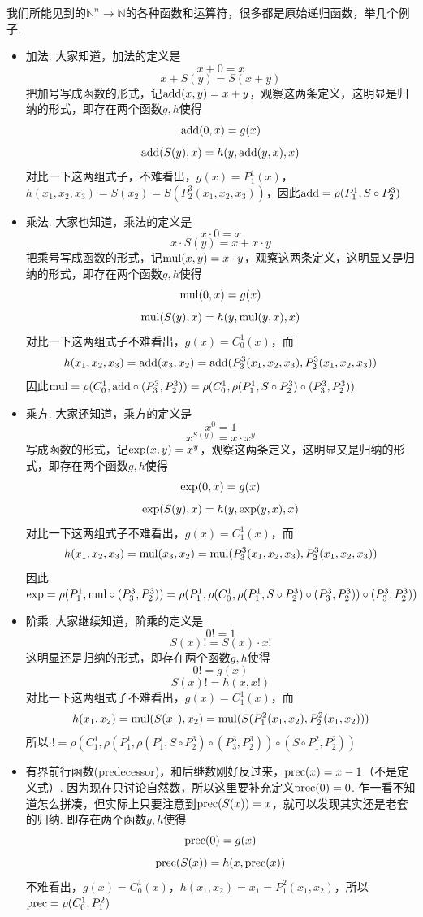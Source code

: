 我们所能见到的\(\mathbb{N}^n \to \mathbb{N}\)的各种函数和运算符，很多都是原始递归函数，举几个例子.
\begin{itemize}
    \item 加法. 大家知道，加法的定义是
    \[x+0 = x\]
    \[x+S(y)=S(x+y)\]
    把加号写成函数的形式，记\({\rm add}(x,y)=x+y\)，观察这两条定义，这明显是归纳的形式，即存在两个函数\(g,h\)使得
    \[{\rm add}(0,x)=g(x)\]
    \[{\rm add}(S(y),x)=h(y,{\rm add}(y,x),x)\]
    对比一下这两组式子，不难看出，\(g(x)=P^1_1(x)\)，\(h(x_1,x_2,x_3)=S(x_2)=S(P^3_2(x_1,x_2,x_3))\)，因此\({\rm add}=\rho(P^1_1,S\circ P^3_2)\)

    \item 乘法. 大家也知道，乘法的定义是
    \[x \cdot 0 = x\]
    \[x \cdot S(y) = x + x \cdot y\]
    把乘号写成函数的形式，记\({\rm mul}(x,y)=x \cdot y\)，观察这两条定义，这明显又是归纳的形式，即存在两个函数\(g,h\)使得
    \[{\rm mul}(0,x)=g(x)\]
    \[{\rm mul}(S(y),x)=h(y,{\rm mul}(y,x),x)\]
    对比一下这两组式子不难看出，\(g(x)=C^1_0(x)\)，而
    \[h(x_1,x_2,x_3)={\rm add}(x_3,x_2)={\rm add}(P^3_3(x_1,x_2,x_3),P^3_2(x_1,x_2,x_3))\]
    因此\({\rm mul} = \rho(C^1_0,{\rm add} \circ (P^3_3,P^3_2)) = \rho(C^1_0,\rho(P^1_1,S\circ P^3_2) \circ (P^3_3,P^3_2))\)

    \item 乘方. 大家还知道，乘方的定义是
    \[x^0 = 1\]
    \[x^{S(y)} = x \cdot x^y\]
    写成函数的形式，记\({\rm exp}(x,y)=x^y\)，观察这两条定义，这明显又是归纳的形式，即存在两个函数\(g,h\)使得
    \[{\rm exp}(0,x)=g(x)\]
    \[{\rm exp}(S(y),x)=h(y,{\rm exp}(y,x),x)\]
    对比一下这两组式子不难看出，\(g(x)=C^1_1(x)\)，而
    \[h(x_1,x_2,x_3)={\rm mul}(x_3,x_2)={\rm mul}(P^3_3(x_1,x_2,x_3),P^3_2(x_1,x_2,x_3))\]
    因此\({\rm exp}=\rho(P^1_1,{\rm mul} \circ (P^3_3,P^3_2)) = \rho(P^1_1,\rho(C^1_0,\rho(P^1_1,S\circ P^3_2) \circ (P^3_3,P^3_2)) \circ (P^3_3,P^3_2))\)

    \item 阶乘. 大家继续知道，阶乘的定义是
    \[0!=1\]
    \[S(x)! = S(x) \cdot x!\]
    这明显还是归纳的形式，即存在两个函数\(g,h\)使得
    \[0!=g(x)\]
    \[S(x)!=h(x,x!)\]
    对比一下这两组式子不难看出，\(g(x)=C^1_1(x)\)，而
    \[h(x_1,x_2)={\rm mul}(S(x_1),x_2) = {\rm mul}(S(P^2_1(x_1,x_2),P^2_2(x_1,x_2)))\]
    所以\(\cdot !=\rho(C^1_1,\rho(P^1_1,\rho(P^1_1,S\circ P^3_2) \circ (P^3_3,P^3_2)) \circ (S \circ P^2_1,P^2_2))\)

    \item 有界前行函数(predecessor)，和后继数刚好反过来，\({\rm prec}(x)=x-1\)（不是定义式）. 因为现在只讨论自然数，所以这里要补充定义\({\rm prec}(0)=0\). 乍一看不知道怎么拼凑，但实际上只要注意到\({\rm prec}(S(x))=x\)，就可以发现其实还是老套的归纳. 即存在两个函数\(g,h\)使得
    \[{\rm prec}(0)=g(x)\]
    \[{\rm prec}(S(x))=h(x,{\rm prec}(x))\]
    不难看出，\(g(x)=C^1_0(x)\)，\(h(x_1,x_2)=x_1 = P^2_1(x_1,x_2)\)，所以\({\rm prec} = \rho(C^1_0, P^2_1)\)
    

\end{itemize}
